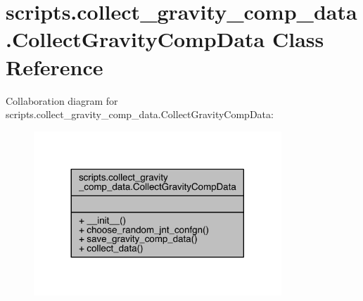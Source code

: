 \hypertarget{classscripts_1_1collect__gravity__comp__data_1_1_collect_gravity_comp_data}{}\section{scripts.\+collect\+\_\+gravity\+\_\+comp\+\_\+data.\+Collect\+Gravity\+Comp\+Data Class Reference}
\label{classscripts_1_1collect__gravity__comp__data_1_1_collect_gravity_comp_data}


Collaboration diagram for scripts.\+collect\+\_\+gravity\+\_\+comp\+\_\+data.\+Collect\+Gravity\+Comp\+Data\+:\nopagebreak
\begin{figure}[H]
\begin{center}
\leavevmode
\includegraphics[width=264pt]{classscripts_1_1collect__gravity__comp__data_1_1_collect_gravity_comp_data__coll__graph}
\end{center}
\end{figure}
